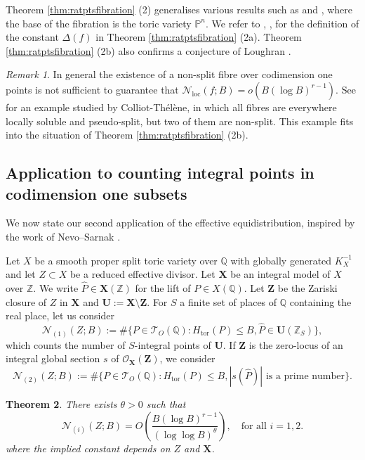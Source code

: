 \documentclass[11pt,letterpaper]{amsart}
\newcommand{\BP}{{\mathbb {P}}}
\newcommand{\BQ}{{\mathbb {Q}}}
\newcommand{\BZ}{{\mathbb {Z}}}
\newcommand{\CN}{{\mathcal {N}}}
\newcommand{\CO}{{\mathcal {O}}}
\newcommand{\CT}{{\mathcal {T}}}
\theoremstyle{plain}
\numberwithin{equation}{section}
\newtheorem{theorem}{Theorem}[section]
\theoremstyle{definition}
\theoremstyle{remark}
\newtheorem{remark}[theorem]{Remark}
\begin{document}
Theorem \ref{thm:ratptsfibration} (2) generalises various results such as \cite[Theorem 1.1]{Loughran-Smeets} and \cite[Theorem 1.3]{BBL}, where the base of the fibration is the toric variety $\BP^n$.  We refer to \cite[\S1.1]{Loughran}, \cite[p. 1450--1451]{Loughran-Smeets}, \cite[p. 5762]{Browning-Loughran} for the definition of the constant $\varDelta(f)$ in Theorem \ref{thm:ratptsfibration} (2a). Theorem \ref{thm:ratptsfibration} (2b) also confirms a conjecture of Loughran \cite[Conjecture 1.7]{Loughran}. 


\begin{remark} In general the existence of a non-split fibre over codimension one points is not sufficient to guarantee that $\CN_{\operatorname{loc}}(f;B)=o(B(\log B)^{r-1})$. See \cite[Example 5.9]{Loughran-Smeets} for an example studied by Colliot-Thélène, in which all fibres are everywhere locally soluble and pseudo-split, but two of them are non-split. This example fits into the situation of Theorem \ref{thm:ratptsfibration} (2b). 
\end{remark}

\subsection{Application to counting integral points in codimension one subsets}\label{se:primevalue}
We now state our second application of the effective equidistribution, inspired by the work of Nevo--Sarnak \cite[Theorems 1.1, 1.4, 1.6]{Nevo-Sarnak}. 

Let $X$ be a smooth proper split toric variety over $\BQ$ with globally generated $K_X^{-1}$ and let $Z\subset X$ be a reduced effective divisor. Let $\mathbf{X}$ be an integral model of $X$ over $\BZ$. We write $\widehat{P}\in\mathbf{X}(\BZ)$ for the lift of $P\in X(\BQ)$. Let $\mathbf{Z}$ be the Zariski closure of $Z$ in $\mathbf{X}$ and $\mathbf{U}:=\mathbf{X}\setminus\mathbf{Z}$. For $S$ a finite set of places of $\BQ$ containing the real place, let us consider $$\CN_{(1)}(Z;B):=\#\{P\in\CT_{O}(\BQ): H_{\operatorname{tor}}(P)\leqslant B,\widehat{P}\in \mathbf{U}(\BZ_S)\},$$ which counts the number of $S$-integral points of $\mathbf{U}$. If $\mathbf{Z}$ is the zero-locus of an integral global section $s$ of $\CO_{\mathbf{X}}(\mathbf{Z})$, we consider $$\CN_{(2)}(Z;B):=\#\{P\in\CT_{O}(\BQ): H_{\operatorname{tor}}(P)\leqslant B,|s(\widehat{P})| \text{ is a prime number}\}.$$
\begin{theorem}\label{thm:primevalue}
There exists $\theta>0$ such that  $$\CN_{(i)}(Z;B)=O\left(\frac{B(\log B)^{r-1}}{(\log\log B)^{
	\theta}}\right), \quad\text{for all }i=1,2.$$ where the implied constant depends on $Z$ and $\mathbf{X}$.\end{theorem}
\end{document}
